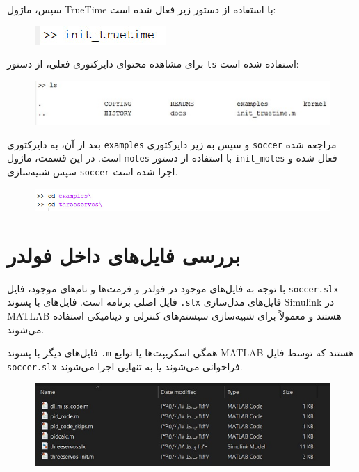 سپس، ماژول TrueTime با استفاده از دستور زیر فعال شده است:

\begin{figure}[h]
	\centering
	\includegraphics{13.jpg}
	\label{fig:label4}
\end{figure}

برای مشاهده محتوای دایرکتوری فعلی، از دستور \texttt{ls} استفاده شده است:

\begin{figure}[h]
	\centering
	\includegraphics{14.jpg}
	\label{fig:label4}
\end{figure}

بعد از آن، به دایرکتوری \texttt{examples} و سپس به زیر دایرکتوری \texttt{soccer} مراجعه شده است. در این قسمت، ماژول \texttt{motes} با استفاده از دستور \texttt{init\_motes} فعال شده و سپس شبیه‌سازی \texttt{soccer} اجرا شده است.

\begin{figure}[H]
	\centering
	\includegraphics{15.jpg}
	\label{fig:label4}
\end{figure}

\newpage

\section*{بررسی فایل‌های داخل فولدر }

با توجه به فایل‌های موجود در فولدر و فرمت‌ها و نام‌های موجود، فایل \texttt{soccer.slx} فایل اصلی برنامه است. فایل‌های با پسوند \texttt{.slx} فایل‌های مدل‌سازی Simulink در MATLAB هستند و معمولاً برای شبیه‌سازی سیستم‌های کنترلی و دینامیکی استفاده می‌شوند.

فایل‌های دیگر با پسوند \texttt{.m} همگی اسکریپت‌ها یا توابع MATLAB هستند که توسط فایل \texttt{soccer.slx} فراخوانی می‌شوند یا به تنهایی اجرا می‌شوند.

\begin{figure}[H]
	\centering
	\includegraphics{2.jpg}
	\label{fig:label4}
\end{figure}

